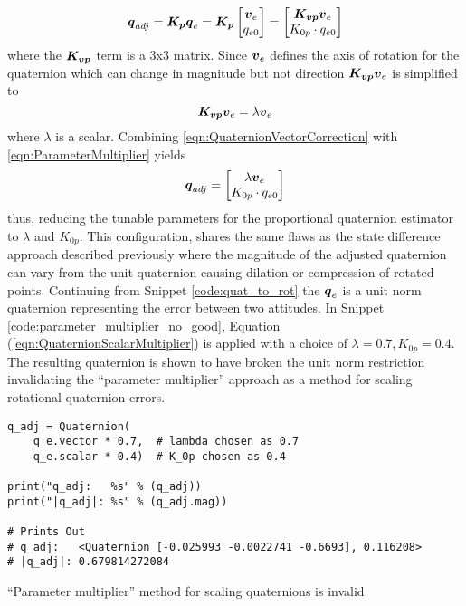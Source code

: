 \begin{equation}
  \boldsymbol{q}_{adj} = \boldsymbol{K_p} \boldsymbol{q}_e
    = \boldsymbol{K_p} \begin{bmatrix} \boldsymbol{v}_e \\ q_{e0} \end{bmatrix}
    = \begin{bmatrix} \boldsymbol{K_{vp}}\boldsymbol{v}_e \\ K_{0p} \cdot q_{e0} \end{bmatrix}
  \label{eqn:ParameterMultiplier}
\end{equation}
where the $\boldsymbol{K_{vp}}$ term is a 3x3 matrix.  Since $\boldsymbol{v}_e$ defines the axis of rotation for the quaternion which can change in magnitude but not direction $\boldsymbol{K_{vp}}\boldsymbol{v}_e$ is simplified to
\begin{equation}
  \boldsymbol{K_{vp}} \boldsymbol{v}_e = \lambda \boldsymbol{v}_e
  \label{eqn:QuaternionVectorCorrection}
\end{equation}
where $\lambda$ is a scalar.
Combining \ref{eqn:QuaternionVectorCorrection} with \ref{eqn:ParameterMultiplier} yields
\begin{equation}
  \boldsymbol{q}_{adj} = \begin{bmatrix} \lambda \boldsymbol{v}_e \\ K_{0p} \cdot q_{e0} \end{bmatrix}
  \label{eqn:QuaternionScalarMultiplier}
\end{equation}
thus, reducing the tunable parameters for the proportional quaternion estimator to $\lambda$ and $K_{0p}$.  This configuration, shares the same flaws as the state difference approach described previously where the magnitude of the adjusted quaternion can vary from the unit quaternion causing dilation or compression of rotated points.  Continuing from Snippet \ref{code:quat_to_rot} the $\boldsymbol{q}_e$ is a unit norm quaternion representing the error between two attitudes.  In Snippet \ref{code:parameter_multiplier_no_good}, Equation (\ref{eqn:QuaternionScalarMultiplier}) is applied with a choice of $\lambda = 0.7, K_{0p} = 0.4$.  The resulting quaternion is shown to have broken the unit norm restriction invalidating the ``parameter multiplier'' approach as a method for scaling rotational quaternion errors.
\begin{listing}
\begin{singlespace}
  \begin{verbatim}
q_adj = Quaternion(
    q_e.vector * 0.7,  # lambda chosen as 0.7
    q_e.scalar * 0.4)  # K_0p chosen as 0.4

print("q_adj:   %s" % (q_adj))
print("|q_adj|: %s" % (q_adj.mag))

# Prints Out
# q_adj:   <Quaternion [-0.025993 -0.0022741 -0.6693], 0.116208>
# |q_adj|: 0.679814272084
  \end{verbatim}
\caption{``Parameter multiplier'' method for scaling quaternions is invalid}
\label{code:parameter_multiplier_no_good}
\nocite{minted}
\end{singlespace}
\end{listing}


